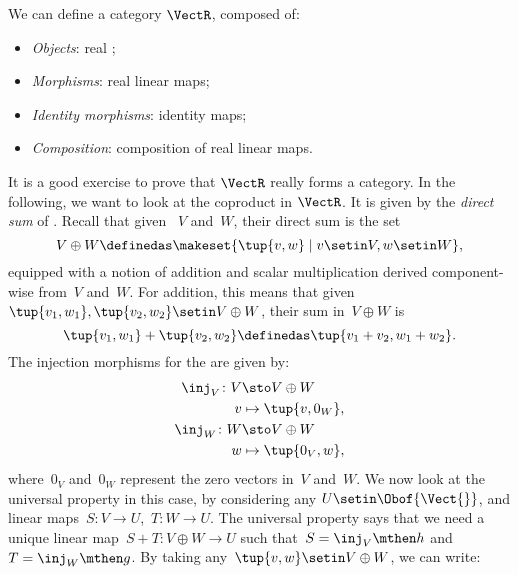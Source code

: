 \begin{example}
    We can define a category $\VectR$, composed of: %
    \begin{itemize}
        \item \emph{Objects}: real ;
        \item \emph{Morphisms}: real linear maps;
        \item \emph{Identity morphisms}: identity maps;
        \item \emph{Composition}: composition of real linear maps.
    \end{itemize}
    It is a good exercise to prove that $\VectR$ really forms a category.
    In the following, we want to look at the coproduct in $\VectR$.
    It is given by the \emph{direct sum} of .
    Recall that given ~$V$ and~$W$, their direct sum is the set
    \begin{equation}
        V\oplus W\definedas \makeset{\tup{v,w}\mid v\setin V,w\setin W},
    \end{equation}
    equipped with a notion of addition and scalar multiplication derived component-wise from~$V$ and~$W$.
    For addition, this means that given~$\tup{v_1,w_1}, \tup{v_2,w_2}\setin V\oplus W$, their sum in~$V \oplus W$ is
    \begin{equation}
        \tup{v_1,w_1}+\tup{v_2,w_2}\definedas \tup{v_1+v_2,w_1+w_2}.
    \end{equation}
    The injection morphisms for the  are given by:
    \begin{equation}
        \begin{aligned}
            \inj_V \colon V & \sto V\oplus W \\
            v               & \mapsto \tup{v,0_W}, \\
            \inj_W \colon W & \sto V\oplus W \\
            w               & \mapsto \tup{0_V,w},
        \end{aligned}
    \end{equation}
    where~$0_V$ and~$0_W$ represent the zero vectors in~$V$ and~$W$.
    We now look at the universal property in this case, by considering any  $U\setin \Obof{\Vect{}}$, and linear maps~$S\colon V\to U$,~$T\colon W\to U$.
    The universal property says that we need a unique linear map~$S+T\colon V\oplus W \to U$ such that~$S=\inj_V\mthen h$ and~$T=\inj_W\mthen g$.
    By taking any~$\tup{v,w}\setin V\oplus W$, we can write:

\end{example}
